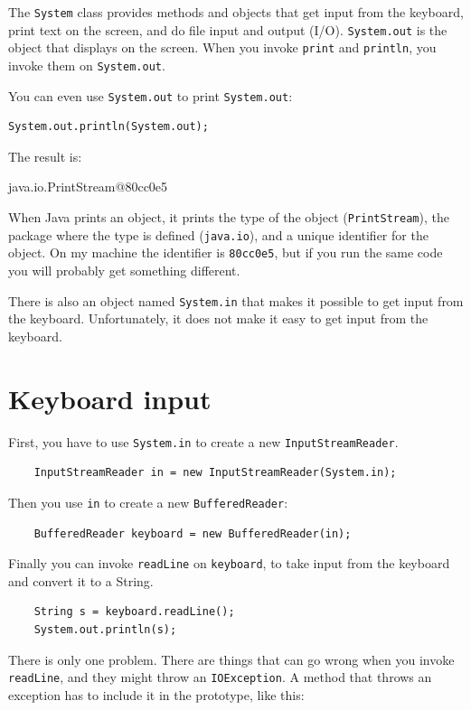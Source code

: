 \documentclass[12pt]{book}
\theoremstyle{exercise}
\begin{document}
The {\tt System} class provides
methods and objects that get input from the keyboard,
print text on the screen, and do file input and output (I/O).
%
{\tt System.out} is the object that displays
on the screen.  When you invoke {\tt print} and {\tt println}, you
invoke them on {\tt System.out}.

You can even use {\tt System.out} to print {\tt System.out}:

\begin{lstlisting}
System.out.println(System.out);
\end{lstlisting}
%
The result is:

\begin{verbatimtab}
java.io.PrintStream@80cc0e5
\end{verbatimtab}
%
When Java prints an object, it prints the type
of the object ({\tt PrintStream}), the package
where the type is defined ({\tt java.io}), and a
unique identifier for the object.  On my machine the identifier
is {\tt 80cc0e5}, but if you run the same code you will
probably get something different.

There is also an object named {\tt System.in} that makes it
possible to get input from the keyboard.  Unfortunately,
it does not make it easy to get input from the keyboard.


\section{Keyboard input}
\label{keyboard}

First, you have to use {\tt System.in} to create a new
{\tt InputStreamReader}.

\begin{lstlisting}
    InputStreamReader in = new InputStreamReader(System.in);
\end{lstlisting}
%
Then you use {\tt in} to create a new {\tt BufferedReader}:

\begin{lstlisting}
    BufferedReader keyboard = new BufferedReader(in);
\end{lstlisting}
%
Finally you can invoke {\tt readLine} on {\tt keyboard},
to take input from the keyboard and convert it to a
String.

\begin{lstlisting}
    String s = keyboard.readLine();
    System.out.println(s);
\end{lstlisting}
%
There is only one problem.  There are things that can go wrong when
you invoke {\tt readLine}, and they might throw an {\tt IOException}.  A
method that throws an exception has to include it in the
prototype, like this:
\end{document}
